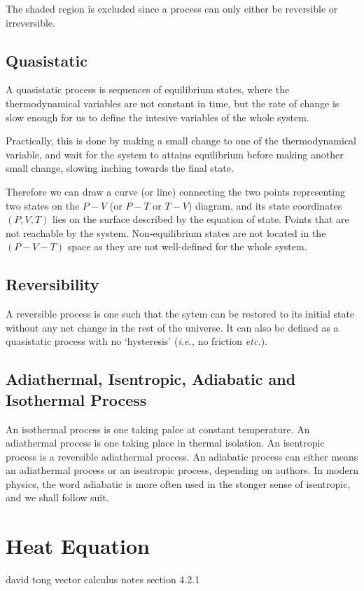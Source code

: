 \documentclass[english,a4paper,12pt]{report}
\begin{document}
The shaded region is excluded since a process can only either be reversible or irreversible.


\subsection{Quasistatic}

A quasistatic process is sequences of equilibrium states, where the thermodynamical variables are not constant in time, but the rate of change is slow enough for us to define the intesive variables of the whole system. 

Practically, this is done by making a small change to one of the thermodynamical variable, and wait for the system to attains equilibrium before making another small change, slowing inching towards the final state.

Therefore we can draw a curve (or line) connecting the two points representing two states on the \(P-V\) (or \(P-T\) or \(T-V\)) diagram, and its state coordinates \((P,V,T)\) lies on the surface described by the equation of state. Points that are not reachable by the system. Non-equilibrium states are not located in the \((P-V-T)\) space as they are not well-defined for the whole system. 

\subsection{Reversibility}

A reversible process is one such that the sytem can be restored to its initial state without any net change in the rest of the universe. It can also be defined as a quasistatic process with no `hysteresis' (\textit{i.e.,} no friction \textit{etc.}).

\subsection{Adiathermal, Isentropic, Adiabatic and Isothermal Process}

An isothermal process is one taking palce at constant temperature. An adiathermal process is one taking place in thermal isolation. An isentropic process is a reversible adiathermal process. An adiabatic process can either means an adiathermal process or an isentropic process, depending on authors. In modern physics, the word adiabatic is more often used in the stonger sense of isentropic, and we shall follow suit.

\section{Heat Equation}

david tong vector calculus notes section 4.2.1
\end{document}
